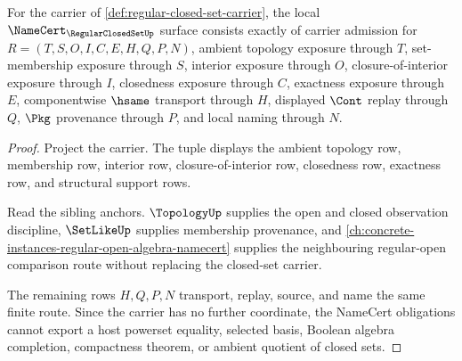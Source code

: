 \begin{theorem}
\label{thm:regular-closed-set-namecert-obligations}
For the carrier of \autoref{def:regular-closed-set-carrier}, the local $\NameCert_{\RegularClosedSetUp}$ surface consists exactly of carrier admission for $R=(T,S,O,I,C,E,H,Q,P,N)$, ambient topology exposure through $T$, set-membership exposure through $S$, interior exposure through $O$, closure-of-interior exposure through $I$, closedness exposure through $C$, exactness exposure through $E$, componentwise $\hsame$ transport through $H$, displayed $\Cont$ replay through $Q$, $\Pkg$ provenance through $P$, and local naming through $N$.
\end{theorem}
\begin{proof}
Project the carrier. The tuple displays the ambient topology row, membership row, interior row, closure-of-interior row, closedness row, exactness row, and structural support rows.

Read the sibling anchors. $\TopologyUp$ supplies the open and closed observation discipline, $\SetLikeUp$ supplies membership provenance, and \autoref{ch:concrete-instances-regular-open-algebra-namecert} supplies the neighbouring regular-open comparison route without replacing the closed-set carrier.

The remaining rows $H,Q,P,N$ transport, replay, source, and name the same finite route. Since the carrier has no further coordinate, the NameCert obligations cannot export a host powerset equality, selected basis, Boolean algebra completion, compactness theorem, or ambient quotient of closed sets.
\end{proof}

